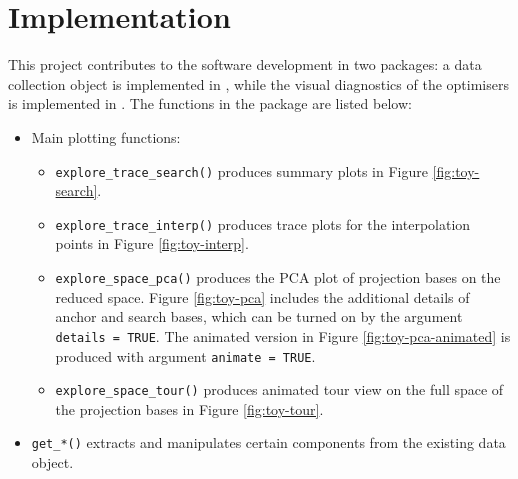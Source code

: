 \hypertarget{implementation}{%
\section{Implementation}\label{implementation}}

This project contributes to the software development in two packages: a
data collection object is implemented in  \citep{tourr},
while the visual diagnostics of the optimisers is implemented in
 \citep{ferrn}. The functions in the 
\citep{ferrn} package are listed below:

\begin{itemize}
\item
  Main plotting functions:

  \begin{itemize}
  \tightlist
  \item
    \texttt{explore\_trace\_search()} produces summary plots in Figure
    \ref{fig:toy-search}.
  \item
    \texttt{explore\_trace\_interp()} produces trace plots for the
    interpolation points in Figure \ref{fig:toy-interp}.
  \item
    \texttt{explore\_space\_pca()} produces the PCA plot of projection
    bases on the reduced space. Figure \ref{fig:toy-pca} includes the
    additional details of anchor and search bases, which can be turned
    on by the argument \texttt{details\ =\ TRUE}. The animated version
    in Figure \ref{fig:toy-pca-animated} is produced with argument
    \texttt{animate\ =\ TRUE}.
  \item
    \texttt{explore\_space\_tour()} produces animated tour view on the
    full space of the projection bases in Figure \ref{fig:toy-tour}.
  \end{itemize}
\item
  \texttt{get\_*()} extracts and manipulates certain components from the
  existing data object.


\end{itemize}
